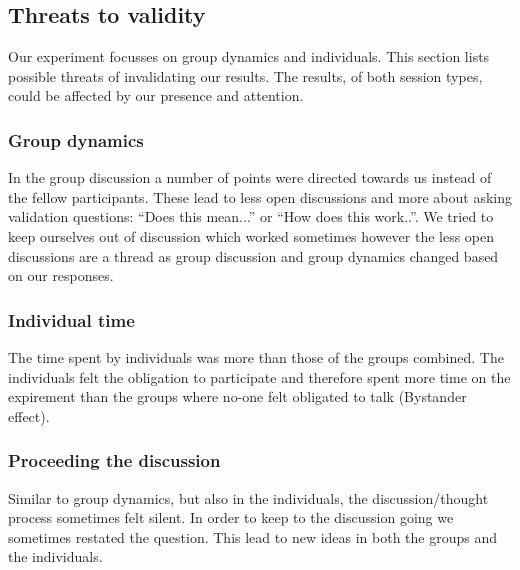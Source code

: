 \subsection{Threats to validity}
\label{threats}

Our experiment focusses on group dynamics and individuals. 
This section lists possible threats of invalidating our results. The results, of both session types, could be affected by our presence and attention.

\subsubsection{Group dynamics}

In the group discussion a number of points were directed towards us instead of the fellow participants.
These lead to less open discussions and more about asking validation questions: ``Does this mean...'' or ``How does this work..''.
We tried to keep ourselves out of discussion which worked sometimes however the less open discussions are a thread as group discussion
and group dynamics changed based on our responses.

\subsubsection{Individual time}
The time spent by individuals was more than those of the groups combined. The individuals felt the obligation to participate
and therefore spent more time on the expirement than the groups where no-one felt obligated to talk (Bystander effect).

\subsubsection{Proceeding the discussion}
Similar to group dynamics, but also in the individuals, the discussion/thought process sometimes felt silent. In order to keep to the discussion
going we sometimes restated the question. This lead to new ideas in both the groups and the individuals.

